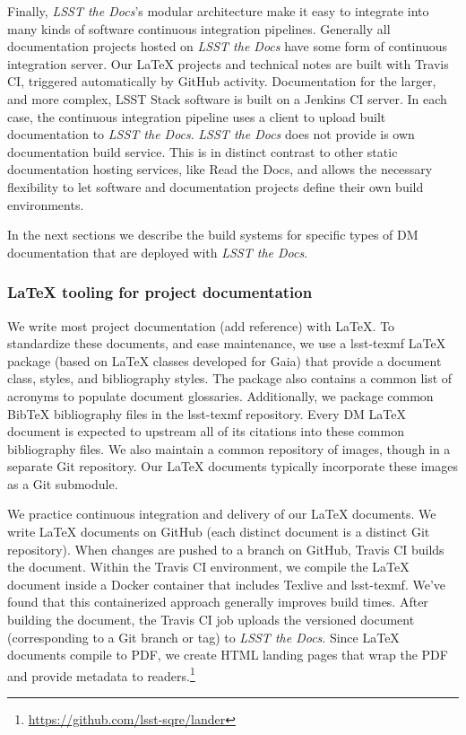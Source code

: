 Finally, \textit{LSST the Docs}'s modular architecture make it easy to integrate into many kinds of software continuous integration pipelines.
Generally all documentation projects hosted on \textit{LSST the Docs} have some form of continuous integration server.
Our LaTeX projects and technical notes are built with Travis CI, triggered automatically by GitHub activity.
Documentation for the larger, and more complex, LSST Stack software is built on a Jenkins CI server.
In each case, the continuous integration pipeline uses a client to upload built documentation to \textit{LSST the Docs}.
\textit{LSST the Docs} does not provide is own documentation build service.
This is in distinct contrast to other static documentation hosting services, like Read the Docs, and allows the necessary flexibility to let software and documentation projects define their own build environments.

In the next sections we describe the build systems for specific types of DM documentation that are deployed with \textit{LSST the Docs}.

\subsubsection{LaTeX tooling for project documentation}
\label{sec:latex_tooling}

We write most project documentation (add reference) with LaTeX.
To standardize these documents, and ease maintenance, we use a lsst-texmf\cite{lsst-texmf} LaTeX package (based on LaTeX classes developed for Gaia) that provide a document class, styles, and bibliography styles.
The package also contains a common list of acronyms to populate document glossaries.
Additionally, we package common BibTeX bibliography files in the lsst-texmf repository.
Every DM LaTeX document is expected to upstream all of its citations into these common bibliography files.
We also maintain a common repository of images, though in a separate Git repository.
Our LaTeX documents typically incorporate these images as a Git submodule.

We practice continuous integration and delivery of our LaTeX documents.
We write LaTeX documents on GitHub (each distinct document is a distinct Git repository).
When changes are pushed to a branch on GitHub, Travis CI builds the document.
Within the Travis CI environment, we compile the LaTeX document inside a Docker container that includes Texlive and lsst-texmf.
We've found that this containerized approach generally improves build times.
After building the document, the Travis CI job uploads the versioned document (corresponding to a Git branch or tag) to \textit{LSST the Docs}.
Since LaTeX documents compile to PDF, we create HTML landing pages that wrap the PDF and provide metadata to readers.\footnote{\url{https://github.com/lsst-sqre/lander}}

